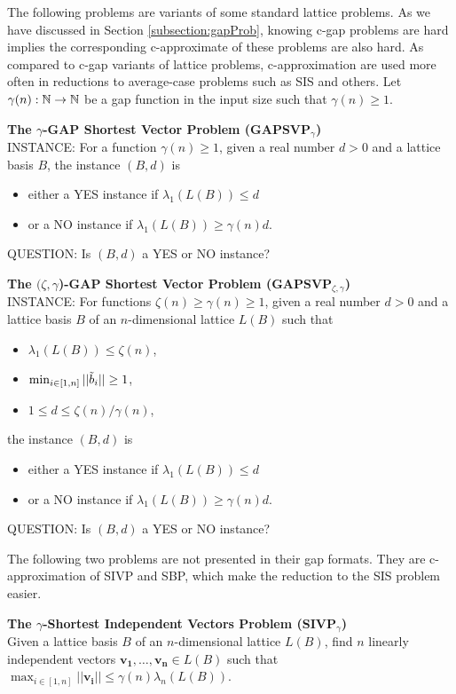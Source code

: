 \documentclass[../main.tex]{subfiles}
\begin{document}
The following problems are variants of some standard lattice problems. As we have discussed in Section \ref{subsection:gapProb}, knowing c-gap problems are hard implies the corresponding c-approximate of these problems are also hard. As compared to c-gap variants of lattice problems, c-approximation are used more often in reductions to average-case problems such as SIS and others. Let $\gamma(n): \mathbb{N} \rightarrow \mathbb{N}$ be a gap function in the input size such that $\gamma(n) \ge 1$.

\begin{tcolorbox}
\noindent
\textbf{The $\gamma$-GAP Shortest Vector Problem (GAPSVP$_{\gamma}$) }\\
INSTANCE: For a function $\gamma(n) \ge 1$, given a real number $d > 0$ and a lattice basis $B$, the instance $(B, d)$ is 
\begin{itemize}  
    \item either a YES instance if $\lambda_1(L(B)) \le d$
    \item or a NO instance if $\lambda_1(L(B)) \ge \gamma(n) d$.
\end{itemize}
QUESTION: Is $(B,d)$ a YES or NO instance? 
\end{tcolorbox}

\begin{tcolorbox}
\noindent
\textbf{The $(\zeta,\gamma$)-GAP Shortest Vector Problem (GAPSVP$_{\zeta,\gamma}$)}\\
INSTANCE: For functions $\zeta(n) \ge \gamma(n) \ge 1$, given a real number $d > 0$ and a lattice basis $B$ of an $n$-dimensional lattice $L(B)$ such that
\begin{itemize}
    \item $\lambda_1(L(B)) \le \zeta(n)$,
    \item $\min_{i \in [1,n]} ||\Tilde{b}_i|| \ge 1$,
    \item $1 \le d \le \zeta(n) / \gamma(n)$, 
\end{itemize}
the instance $(B, d)$ is 
\begin{itemize}
    \item either a YES instance if $\lambda_1(L(B)) \le d$
    \item or a NO instance if $\lambda_1(L(B)) \ge \gamma(n) d$.
\end{itemize}
QUESTION: Is $(B,d)$ a YES or NO instance? 
\end{tcolorbox}

The following two problems are not presented in their gap formats. They are c-approximation of SIVP and SBP, which make the reduction to the SIS problem easier. 
\begin{tcolorbox}
\noindent
\textbf{The $\gamma$-Shortest Independent Vectors Problem (SIVP$_{\gamma}$)}\\
Given a lattice basis $B$ of an $n$-dimensional lattice $L(B)$, find $n$ linearly independent vectors $\mathbf{v_1}, \dots, \mathbf{v_n} \in L(B)$ such that $\max_{i \in [1,n]} ||\mathbf{v_i}|| \le \gamma(n) \lambda_n(L(B))$.
\end{tcolorbox}
\end{document}
